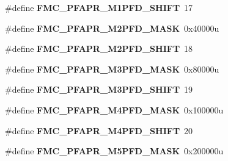 \begin{DoxyCompactItemize}
\item 
\hypertarget{group___f_m_c___register___masks_gaf51c3aa2255cc9c8efe5c2a705593f8f}{}\#define {\bfseries F\+M\+C\+\_\+\+P\+F\+A\+P\+R\+\_\+\+M1\+P\+F\+D\+\_\+\+S\+H\+I\+F\+T}~17\label{group___f_m_c___register___masks_gaf51c3aa2255cc9c8efe5c2a705593f8f}

\item 
\hypertarget{group___f_m_c___register___masks_ga25320b4377f5b7137bece86c278122a4}{}\#define {\bfseries F\+M\+C\+\_\+\+P\+F\+A\+P\+R\+\_\+\+M2\+P\+F\+D\+\_\+\+M\+A\+S\+K}~0x40000u\label{group___f_m_c___register___masks_ga25320b4377f5b7137bece86c278122a4}

\item 
\hypertarget{group___f_m_c___register___masks_ga52792f2b60fa3fef0d38b172867adfe9}{}\#define {\bfseries F\+M\+C\+\_\+\+P\+F\+A\+P\+R\+\_\+\+M2\+P\+F\+D\+\_\+\+S\+H\+I\+F\+T}~18\label{group___f_m_c___register___masks_ga52792f2b60fa3fef0d38b172867adfe9}

\item 
\hypertarget{group___f_m_c___register___masks_ga7ec6298e08ea7c43a5233d895ebb3c06}{}\#define {\bfseries F\+M\+C\+\_\+\+P\+F\+A\+P\+R\+\_\+\+M3\+P\+F\+D\+\_\+\+M\+A\+S\+K}~0x80000u\label{group___f_m_c___register___masks_ga7ec6298e08ea7c43a5233d895ebb3c06}

\item 
\hypertarget{group___f_m_c___register___masks_ga0de5ac6c72c9bc67057f028f4a946539}{}\#define {\bfseries F\+M\+C\+\_\+\+P\+F\+A\+P\+R\+\_\+\+M3\+P\+F\+D\+\_\+\+S\+H\+I\+F\+T}~19\label{group___f_m_c___register___masks_ga0de5ac6c72c9bc67057f028f4a946539}

\item 
\hypertarget{group___f_m_c___register___masks_gaa1b82d16461f952ac2b92896f79059a3}{}\#define {\bfseries F\+M\+C\+\_\+\+P\+F\+A\+P\+R\+\_\+\+M4\+P\+F\+D\+\_\+\+M\+A\+S\+K}~0x100000u\label{group___f_m_c___register___masks_gaa1b82d16461f952ac2b92896f79059a3}

\item 
\hypertarget{group___f_m_c___register___masks_gaf06886cc4a8e2d455cef47f111ac8a4b}{}\#define {\bfseries F\+M\+C\+\_\+\+P\+F\+A\+P\+R\+\_\+\+M4\+P\+F\+D\+\_\+\+S\+H\+I\+F\+T}~20\label{group___f_m_c___register___masks_gaf06886cc4a8e2d455cef47f111ac8a4b}

\item 
\hypertarget{group___f_m_c___register___masks_ga4ac647b6c05fcd080c70febe293bd169}{}\#define {\bfseries F\+M\+C\+\_\+\+P\+F\+A\+P\+R\+\_\+\+M5\+P\+F\+D\+\_\+\+M\+A\+S\+K}~0x200000u\label{group___f_m_c___register___masks_ga4ac647b6c05fcd080c70febe293bd169}


\end{DoxyCompactItemize}
